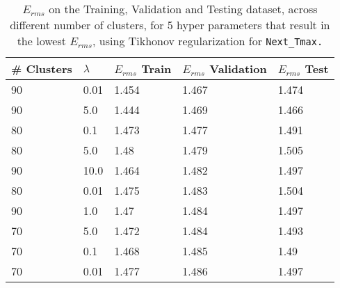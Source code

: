 \def\arraystretch{1.25}
\begin{table}[H]
\centering
\begin{tabular}{l l l l l}
\hline
\hline
\textbf{\# Clusters} & \textbf{$\lambda$} & \textbf{$E_{rms}$ Train} & \textbf{$E_{rms}$ Validation} & \textbf{$E_{rms}$ Test}\\
\hline
\hline
90 & 0.01 & 1.454 & 1.467 & 1.474\\
90 & 5.0 & 1.444 & 1.469 & 1.466\\
80 & 0.1 & 1.473 & 1.477 & 1.491\\
80 & 5.0 & 1.48 & 1.479 & 1.505\\
90 & 10.0 & 1.464 & 1.482 & 1.497\\
80 & 0.01 & 1.475 & 1.483 & 1.504\\
90 & 1.0 & 1.47 & 1.484 & 1.497\\
70 & 5.0 & 1.472 & 1.484 & 1.493\\
70 & 0.1 & 1.468 & 1.485 & 1.49\\
70 & 0.01 & 1.477 & 1.486 & 1.497\\
\hline
\end{tabular}
\caption{$E_{rms}$ on the Training, Validation and Testing dataset, across different number of clusters, for 5 hyper parameters that result in the lowest $E_{rms}$, using Tikhonov regularization for \tt{Next\_Tmax}.}
\end{table}
